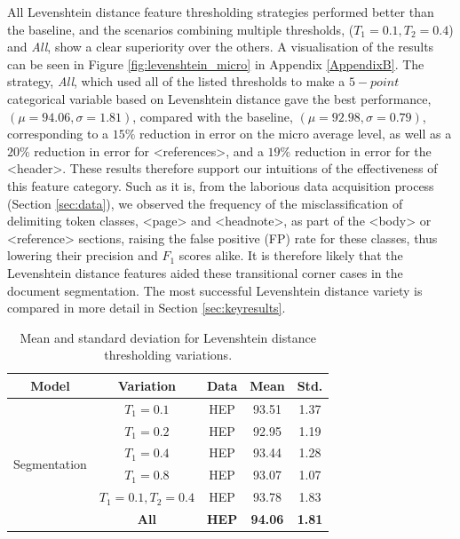 All Levenshtein distance feature thresholding strategies performed better than the baseline, and the scenarios combining multiple thresholds, ($T_1 = 0.1, T_2 = 0.4$) and \emph{All}, show a clear superiority over the others. A visualisation of the results can be seen in Figure \ref{fig:levenshtein_micro} in Appendix \ref{AppendixB}. The strategy, \emph{All}, which used all of the listed thresholds to make a $5-point$ categorical variable based on Levenshtein distance gave the best performance, $(\mu = 94.06, \sigma = 1.81)$, compared with the baseline, $(\mu = 92.98, \sigma = 0.79)$, corresponding to a $15\%$ reduction in error on the micro average level, as well as a $20\%$ reduction in error for <references>, and a $19\%$ reduction in error for the <header>. These results therefore support our intuitions of the effectiveness of this feature category. Such as it is, from the laborious data acquisition process (Section \ref{sec:data}), we observed the frequency of the misclassification of delimiting token classes, <page> and <headnote>, as part of the <body> or <reference> sections, raising the false positive (FP) rate for these classes, thus lowering their precision and $F_1$ scores alike. It is therefore likely that the Levenshtein distance features aided these transitional corner cases in the document segmentation. The most successful Levenshtein distance variety is compared in more detail in Section \ref{sec:keyresults}. 

\begin{table}[h]
\begin{center}
\begin{tabular}{|c|c|c|c|c|}
\hline
Model & Variation & Data & Mean & Std.\\
\hline
\multirow{6}{*}{Segmentation} & $T_1 = 0.1$ & HEP & 93.51 & 1.37\\\cline{2-5}
& $T_1 = 0.2$ & HEP & 92.95 & 1.19\\\cline{2-5}
& $T_1 = 0.4$ & HEP & 93.44 & 1.28\\\cline{2-5}
& $T_1 = 0.8$ & HEP & 93.07 & 1.07\\\cline{2-5}
& $T_1 = 0.1, T_2 = 0.4$ & HEP & 93.78 & 1.83\\\cline{2-5}
& \textbf{All} & \textbf{HEP} & \textbf{94.06} & \textbf{1.81}\\\cline{2-5}
\hline
\end{tabular}
\caption{Mean and standard deviation for Levenshtein distance thresholding variations.}
\label{table:levenshteinresults}
\end{center}
\end{table}

